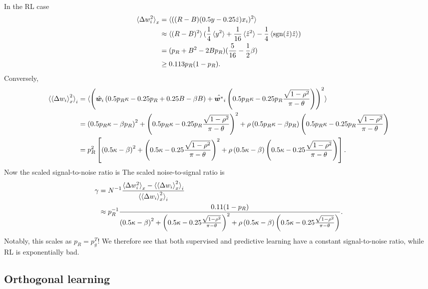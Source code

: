 \documentclass{article}
\renewcommand\b\bm
\begin{document}
In the RL case
\begin{align}
    \braket{\Delta w_i^2}_{x} &= \braket{((R-B)( 0.5 y - 0.25 \hat{z}) x_i)^2}\\
    &\approx \braket{(R-B)^2} (\frac{1}{4} \braket{y^2} + \frac{1}{16} \braket{\hat{z}^2} - \frac{1}{4} \braket{\text{sgn}(\hat{z}) \hat{z}})\\
    &= (p_R + B^2 - 2Bp_R)(\frac{5}{16} - \frac{1}{2}\beta)\\
    &\geq 0.113 p_R(1-p_R).
\end{align}
Conversely, 
\begin{align}
    \braket{\braket{\Delta w_i}_x^2}_i &= \braket{ \left ( \hat{\b{w}}_i \left ( 0.5 p_R \kappa - 0.25 p_R  + 0.25 B - \beta B \right ) + \hat{\b{w}^*}_i \left ( 0.5 p_R \kappa - 0.25 p_R \frac{\sqrt{1-\rho^2} }{\pi - \theta} \right ) \right )^2 }\\
    &= \left ( 0.5 p_R \kappa - \beta p_R \right )^2 + \left ( 0.5 p_R \kappa - 0.25 p_R \frac{\sqrt{1-\rho^2} }{\pi - \theta} \right )^2 + \rho \left ( 0.5 p_R \kappa - \beta p_R \right ) \left ( 0.5 p_R \kappa - 0.25 p_R \frac{\sqrt{1-\rho^2} }{\pi - \theta} \right )\\
    &= p_R^2 \left [ \left ( 0.5 \kappa - \beta \right )^2 + \left ( 0.5 \kappa - 0.25 \frac{\sqrt{1-\rho^2} }{\pi - \theta} \right )^2 + \rho \left ( 0.5 \kappa - \beta \right ) \left ( 0.5 \kappa - 0.25 \frac{\sqrt{1-\rho^2} }{\pi - \theta} \right ) \right ].
\end{align}
Now the scaled signal-to-noise ratio is
The scaled noise-to-signal ratio is
\begin{align}
    \gamma &= N^{-1} \frac{\braket{\Delta w_i^2}_{x} - \braket{\braket{\Delta w_i}_x^2}_i}{\braket{\braket{\Delta w_i}_x^2}_i}\\
    &\approx p_R^{-1} \frac{0.11 (1-p_R)}{\left ( 0.5 \kappa - \beta \right )^2 + \left ( 0.5 \kappa - 0.25 \frac{\sqrt{1-\rho^2} }{\pi - \theta} \right )^2 + \rho \left ( 0.5 \kappa - \beta \right ) \left ( 0.5 \kappa - 0.25 \frac{\sqrt{1-\rho^2} }{\pi - \theta} \right )}.
\end{align}
Notably, this scales as $p_R = p_g^T$!
We therefore see that both supervised and predictive learning have a constant signal-to-noise ratio, while RL is exponentially bad.


\subsection*{Orthogonal learning}
\end{document}
